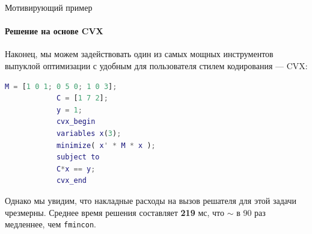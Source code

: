 \documentclass{beamer}
\begin{document}
\begin{frame}[fragile]{Мотивирующий пример}
	\framesubtitle{Решение на основе CVX}
	\begin{flushleft}
		
		{\small 
		
		Наконец, мы можем задействовать один из самых мощных инструментов выпуклой оптимизации с удобным для пользователя стилем кодирования — CVX:
		
		\begin{lstlisting}[language=Matlab]
			M = [1 0 1; 0 5 0; 1 0 3];
			C = [1 7 2];
			y = 1;
			cvx_begin
			variables x(3);
			minimize( x' * M * x );
			subject to
			C*x == y;
			cvx_end
		\end{lstlisting}
		
		Однако мы увидим, что накладные расходы на вызов решателя для этой задачи чрезмерны. Среднее время решения составляет \textbf{219} мс, что $\sim$ в 90 раз медленнее, чем \texttt{fmincon}.
		
	}
	\end{flushleft}
\end{frame}




%
%

\myqrframe
\end{document}
